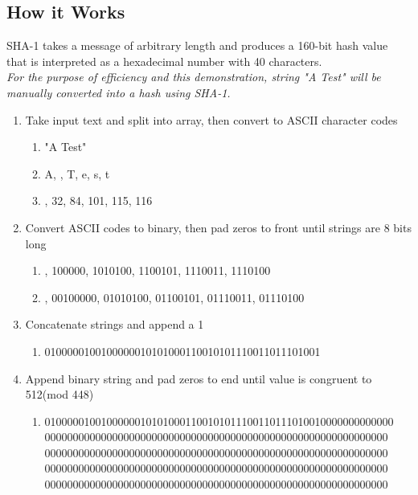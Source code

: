 \documentclass[12pt]{extarticle}
\begin{document}
\subsection{How it Works}
SHA-1 takes a message of arbitrary length and produces a 160-bit hash value that is interpreted as a hexadecimal number with 40 characters.\\
{\slshape{For the purpose of efficiency and this demonstration, string "A Test" will be manually converted into a hash using SHA-1.}}
\begin{enumerate}
  \item Take input text and split into array, then convert to ASCII character codes
    \begin{enumerate}
        \item "A Test"
        \item \lbrack A,    , T, e, s, t\rbrack
        \item {}, 32, 84, 101, 115, 116\rbrack
    \end{enumerate}
  \item Convert ASCII codes to binary, then pad zeros to front until strings are 8 bits long
    \begin{enumerate}
        \item {}, 100000, 1010100, 1100101, 1110011, 1110100\rbrack
        \item {}, 00100000, 01010100, 01100101, 01110011, 01110100\rbrack
    \end{enumerate}
  \item Concatenate strings and append a 1
    \begin{enumerate}
        \item 0100000100100000010101000110010101110011011101001
    \end{enumerate}
  \item Append binary string and pad zeros to end until value is congruent to 512(mod 448)
    \begin{enumerate}
        \item 01000001001000000101010001100101011100110111010010000000000000\\
        0000000000000000000000000000000000000000000000000000000000000\\
        0000000000000000000000000000000000000000000000000000000000000\\
        0000000000000000000000000000000000000000000000000000000000000\\
        0000000000000000000000000000000000000000000000000000000000000\\

\end{enumerate}
\end{enumerate}
\end{document}
